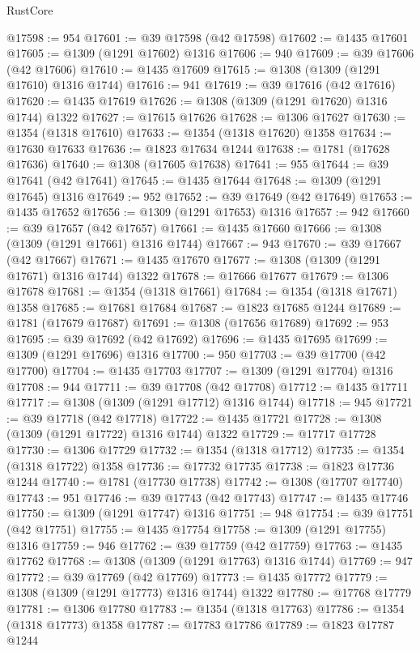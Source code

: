 \begin{lexlean}{RustCore}
\begin{coremodule}
@17598 := 954
@17601 := @39 @17598 (@42 @17598)
@17602 := @1435 @17601
@17605 := @1309 (@1291 @17602) @1316
@17606 := 940
@17609 := @39 @17606 (@42 @17606)
@17610 := @1435 @17609
@17615 := @1308 (@1309 (@1291 @17610) @1316 @1744)
@17616 := 941
@17619 := @39 @17616 (@42 @17616)
@17620 := @1435 @17619
@17626 := @1308 (@1309 (@1291 @17620) @1316 @1744) @1322
@17627 := @17615 @17626
@17628 := @1306 @17627
@17630 := @1354 (@1318 @17610)
@17633 := @1354 (@1318 @17620) @1358
@17634 := @17630 @17633
@17636 := @1823 @17634 @1244
@17638 := @1781 (@17628 @17636)
@17640 := @1308 (@17605 @17638)
@17641 := 955
@17644 := @39 @17641 (@42 @17641)
@17645 := @1435 @17644
@17648 := @1309 (@1291 @17645) @1316
@17649 := 952
@17652 := @39 @17649 (@42 @17649)
@17653 := @1435 @17652
@17656 := @1309 (@1291 @17653) @1316
@17657 := 942
@17660 := @39 @17657 (@42 @17657)
@17661 := @1435 @17660
@17666 := @1308 (@1309 (@1291 @17661) @1316 @1744)
@17667 := 943
@17670 := @39 @17667 (@42 @17667)
@17671 := @1435 @17670
@17677 := @1308 (@1309 (@1291 @17671) @1316 @1744) @1322
@17678 := @17666 @17677
@17679 := @1306 @17678
@17681 := @1354 (@1318 @17661)
@17684 := @1354 (@1318 @17671) @1358
@17685 := @17681 @17684
@17687 := @1823 @17685 @1244
@17689 := @1781 (@17679 @17687)
@17691 := @1308 (@17656 @17689)
@17692 := 953
@17695 := @39 @17692 (@42 @17692)
@17696 := @1435 @17695
@17699 := @1309 (@1291 @17696) @1316
@17700 := 950
@17703 := @39 @17700 (@42 @17700)
@17704 := @1435 @17703
@17707 := @1309 (@1291 @17704) @1316
@17708 := 944
@17711 := @39 @17708 (@42 @17708)
@17712 := @1435 @17711
@17717 := @1308 (@1309 (@1291 @17712) @1316 @1744)
@17718 := 945
@17721 := @39 @17718 (@42 @17718)
@17722 := @1435 @17721
@17728 := @1308 (@1309 (@1291 @17722) @1316 @1744) @1322
@17729 := @17717 @17728
@17730 := @1306 @17729
@17732 := @1354 (@1318 @17712)
@17735 := @1354 (@1318 @17722) @1358
@17736 := @17732 @17735
@17738 := @1823 @17736 @1244
@17740 := @1781 (@17730 @17738)
@17742 := @1308 (@17707 @17740)
@17743 := 951
@17746 := @39 @17743 (@42 @17743)
@17747 := @1435 @17746
@17750 := @1309 (@1291 @17747) @1316
@17751 := 948
@17754 := @39 @17751 (@42 @17751)
@17755 := @1435 @17754
@17758 := @1309 (@1291 @17755) @1316
@17759 := 946
@17762 := @39 @17759 (@42 @17759)
@17763 := @1435 @17762
@17768 := @1308 (@1309 (@1291 @17763) @1316 @1744)
@17769 := 947
@17772 := @39 @17769 (@42 @17769)
@17773 := @1435 @17772
@17779 := @1308 (@1309 (@1291 @17773) @1316 @1744) @1322
@17780 := @17768 @17779
@17781 := @1306 @17780
@17783 := @1354 (@1318 @17763)
@17786 := @1354 (@1318 @17773) @1358
@17787 := @17783 @17786
@17789 := @1823 @17787 @1244

\end{coremodule}
\end{lexlean}
